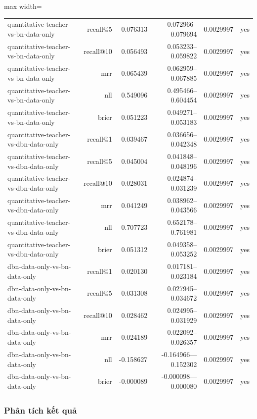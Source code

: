 \begin{table}[!htbp]
\begin{adjustbox}{max width=\textwidth}
\begin{tabular}{@{}lrrrrr@{}}
quantitative-teacher-vs-bn-data-only & recall@5 & 0.076313 & 0.072966--0.079694 & 0.0029997 & yes \\
quantitative-teacher-vs-bn-data-only & recall@10 & 0.056493 & 0.053233--0.059822 & 0.0029997 & yes \\
quantitative-teacher-vs-bn-data-only & mrr & 0.065439 & 0.062959--0.067885 & 0.0029997 & yes \\
quantitative-teacher-vs-bn-data-only & nll & 0.549096 & 0.495466--0.604454 & 0.0029997 & yes \\
quantitative-teacher-vs-bn-data-only & brier & 0.051223 & 0.049271--0.053183 & 0.0029997 & yes \\
quantitative-teacher-vs-dbn-data-only & recall@1 & 0.039467 & 0.036656--0.042348 & 0.0029997 & yes \\
quantitative-teacher-vs-dbn-data-only & recall@5 & 0.045004 & 0.041848--0.048196 & 0.0029997 & yes \\
quantitative-teacher-vs-dbn-data-only & recall@10 & 0.028031 & 0.024874--0.031239 & 0.0029997 & yes \\
quantitative-teacher-vs-dbn-data-only & mrr & 0.041249 & 0.038962--0.043566 & 0.0029997 & yes \\
quantitative-teacher-vs-dbn-data-only & nll & 0.707723 & 0.652178--0.761981 & 0.0029997 & yes \\
quantitative-teacher-vs-dbn-data-only & brier & 0.051312 & 0.049358--0.053252 & 0.0029997 & yes \\
dbn-data-only-vs-bn-data-only & recall@1 & 0.020130 & 0.017181--0.023184 & 0.0029997 & yes \\
dbn-data-only-vs-bn-data-only & recall@5 & 0.031308 & 0.027945--0.034672 & 0.0029997 & yes \\
dbn-data-only-vs-bn-data-only & recall@10 & 0.028462 & 0.024995--0.031929 & 0.0029997 & yes \\
dbn-data-only-vs-bn-data-only & mrr & 0.024189 & 0.022092--0.026357 & 0.0029997 & yes \\
dbn-data-only-vs-bn-data-only & nll & -0.158627 & -0.164966---0.152302 & 0.0029997 & yes \\
dbn-data-only-vs-bn-data-only & brier & -0.000089 & -0.000098---0.000080 & 0.0029997 & yes \\
\bottomrule
\end{tabular}
\end{adjustbox}
\end{table}

\subsubsection*{Phân tích kết quả}


